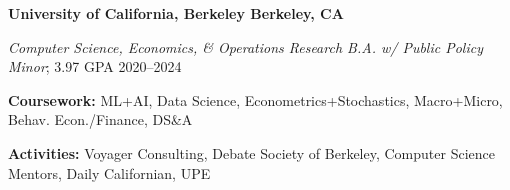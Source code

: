 \textbf{University of California, Berkeley \hfill Berkeley, CA} \par
\textit{Computer Science, Economics, \& Operations Research B.A. w/ Public Policy Minor}; 3.97 GPA \hfill 2020--2024\par
\textbf{Coursework:} ML+AI, Data Science, Econometrics+Stochastics, Macro+Micro, Behav. Econ./Finance, DS\&A\par
\textbf{Activities:} Voyager Consulting, Debate Society of Berkeley, Computer Science Mentors, Daily Californian, UPE